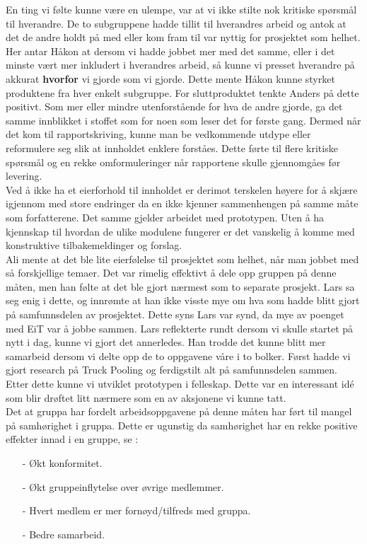 En ting vi følte kunne være en ulempe, var at vi ikke stilte nok kritiske spørsmål til hverandre. De to subgruppene hadde tillit til hverandres arbeid og antok at det de andre holdt på med eller kom fram til var nyttig for prosjektet som helhet. Her antar Håkon at dersom vi hadde jobbet mer med det samme, eller i det minste vært mer inkludert i hverandres arbeid, så kunne vi presset hverandre på akkurat \textbf{hvorfor} vi gjorde som vi gjorde. Dette mente Håkon kunne styrket produktene fra hver enkelt subgruppe. For sluttproduktet tenkte Anders på dette positivt. Som mer eller mindre utenforstående for hva de andre gjorde, ga det samme innblikket i stoffet som for noen som leser det for første gang. Dermed når det kom til rapportskriving, kunne man be vedkommende utdype eller reformulere seg slik at innholdet enklere forståes. Dette førte til flere kritiske spørsmål og en rekke omformuleringer når rapportene skulle gjennomgåes før levering.\\

Ved å ikke ha et eierforhold til innholdet er derimot terskelen høyere for å skjære igjennom med store endringer da en ikke kjenner sammenhengen på samme måte som forfatterene. Det samme gjelder arbeidet med prototypen. Uten å ha kjennskap til hvordan de ulike modulene fungerer er det vanskelig å komme med konstruktive tilbakemeldinger og forslag.\\

Ali mente at det ble lite eierfølelse til prosjektet som helhet, når man jobbet med så forskjellige temaer. Det var rimelig effektivt å dele opp gruppen på denne måten, men han følte at det ble gjort nærmest som to separate prosjekt. Lars sa seg enig i dette, og innrømte at han ikke visste mye om hva som hadde blitt gjort på samfunnsdelen av prosjektet. Dette syns Lars var synd, da mye av poenget med EiT var å jobbe sammen. Lars reflekterte rundt dersom vi skulle startet på nytt i dag, kunne vi gjort det annerledes. Han trodde det kunne blitt mer samarbeid dersom vi delte opp de to oppgavene våre i to bolker. Først hadde vi gjort research på Truck Pooling og ferdigstilt alt på samfunnsdelen sammen. Etter dette kunne vi utviklet prototypen i felleskap. Dette var en interessant idé som blir drøftet litt nærmere som en av aksjonene vi kunne tatt.\\

Det at gruppa har fordelt arbeidsoppgavene på denne måten har ført til mangel på samhørighet i gruppa. Dette er ugunstig da samhørighet har en rekke positive effekter innad i en gruppe, se \cite{Promotegroup}:
\begin{itemize}
    \item [-] Økt konformitet.
    \item [-] Økt gruppeinflytelse over øvrige medlemmer.
    \item [-] Hvert medlem er mer fornøyd/tilfreds med gruppa.
    \item [-] Bedre samarbeid.
\end{itemize}

